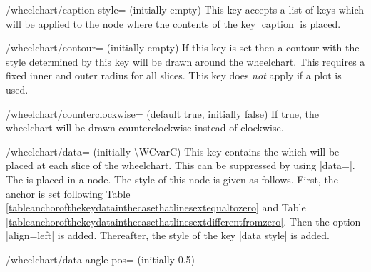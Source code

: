 \documentclass[a4paper,english,dvipsnames]{ltxdoc}
\begin{document}
\begin{stylekey}{/wheelchart/caption style= (initially \normalfont empty)}
This key accepts a list of keys which will be applied to the node where the contents of the key |caption| is placed.
\begin{codeexample}[width=10cm]
\end{codeexample}
\end{stylekey}
\begin{stylekey}{/wheelchart/contour= (initially \normalfont empty)}
If this key is set then a contour with the style determined by this key will be drawn around the wheelchart. This requires a fixed inner and outer radius for all slices. This key does \emph{not} apply if a plot is used.
\end{stylekey}
\begin{key}{/wheelchart/counterclockwise= (default true, initially false)}
If true, the wheelchart will be drawn counterclockwise instead of clockwise.
\end{key}
\begin{key}{/wheelchart/data= (initially \textbackslash WCvarC)}
This key contains the  which will be placed at each slice of the wheelchart. This can be suppressed by using |data={}|. The  is placed in a node. The style of this node is given as follows. First, the anchor is set following Table \ref{tableanchorofthekeydatainthecasethatlinesextequaltozero} and Table \ref{tableanchorofthekeydatainthecasethatlinesextdifferentfromzero}. Then the option |align=left| is added. Thereafter, the style of the key |data style| is added.
\end{key}
\begin{key}{/wheelchart/data angle pos= (initially 0.5)}
\end{key}
\end{document}

